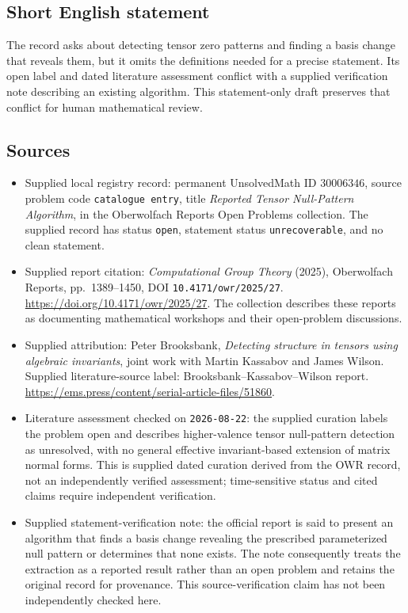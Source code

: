 \documentclass[11pt]{article}
\begin{document}
\subsection{Short English statement}
The record asks about detecting tensor zero patterns and finding a basis change that reveals them, but it omits the definitions needed for a precise statement. Its open label and dated literature assessment conflict with a supplied verification note describing an existing algorithm. This statement-only draft preserves that conflict for human mathematical review.
\subsection{Sources}
\begin{itemize}
\item Supplied local registry record: permanent UnsolvedMath ID \(30006346\), source problem code \texttt{catalogue entry}, title \emph{Reported Tensor Null-Pattern Algorithm}, in the Oberwolfach Reports Open Problems collection. The supplied record has status \texttt{open}, statement status \texttt{unrecoverable}, and no clean statement.
\item Supplied report citation: \emph{Computational Group Theory} (2025), Oberwolfach Reports, pp.\ 1389--1450, DOI \texttt{10.4171/owr/2025/27}. \url{https://doi.org/10.4171/owr/2025/27}. The collection describes these reports as documenting mathematical workshops and their open-problem discussions.
\item Supplied attribution: Peter Brooksbank, \emph{Detecting structure in tensors using algebraic invariants}, joint work with Martin Kassabov and James Wilson. Supplied literature-source label: Brooksbank--Kassabov--Wilson report. \url{https://ems.press/content/serial-article-files/51860}.
\item Literature assessment checked on \texttt{2026-08-22}: the supplied curation labels the problem open and describes higher-valence tensor null-pattern detection as unresolved, with no general effective invariant-based extension of matrix normal forms. This is supplied dated curation derived from the OWR record, not an independently verified assessment; time-sensitive status and cited claims require independent verification.
\item Supplied statement-verification note: the official report is said to present an algorithm that finds a basis change revealing the prescribed parameterized null pattern or determines that none exists. The note consequently treats the extraction as a reported result rather than an open problem and retains the original record for provenance. This source-verification claim has not been independently checked here.
\end{itemize}
\end{document}
